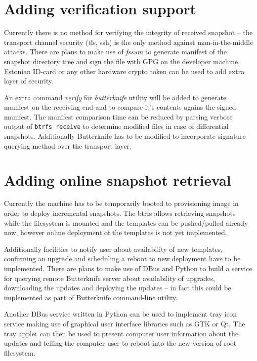 \documentclass[a4paper,11pt]{kth-mag}
\begin{document}
\section{Adding verification support}

Currently there is no method for verifying the integrity
of received snapshot --
the transport channel security (\acrshort{tls},
\acrshort{ssh}) is the only method against
man-in-the-middle attacks.
There are plans to make use of \emph{fssum} to generate
manifest of the snapshot directory tree and
sign the file with GPG on the developer machine.
Estonian ID-card or any other hardware crypto
token can be used to add extra layer of security.

An extra command \emph{verify} for
\emph{butterknife} utility will be added
to generate manifest on the receiving end and
to compare it's contents agains the signed manifest.
The manifest comparison time can be reduced by
parsing verbose output of \lstinline!btrfs receive!
to determine modified files
in case of differential snapshots.
Additionally Butterknife has to be modified
to incorporate signature querying method
over the transport layer.

\section{Adding online snapshot retrieval}

Currently the machine has to be
temporarily booted to provisioning image in order
to deploy incremental snapshots.
The \acrshort{btrfs} allows retrieving
snapshots while the filesystem is mounted and
the templates can be pushed/pulled already now,
however online deployment of the templates
is not yet implemented.

Additionally facilities to notify user
about availability of new templates,
confirming an upgrade and
scheduling a reboot to new deployment
have to be implemented.
There are plans to make use of
DBus and Python to build a service for querying
remote Butterknife server about
availability of upgrades,
downloading the updates
and deploying the updates -- in fact
this could be implemented as part of Butterknife
command-line utility.

Another DBus service written in Python
can be used to implement tray icon service
making use of graphical user interface libraries such
as GTK or Qt.
The tray applet can then be used to present
computer user information about the updates and
telling the computer user to reboot into the new
version of root filesystem.
\end{document}
